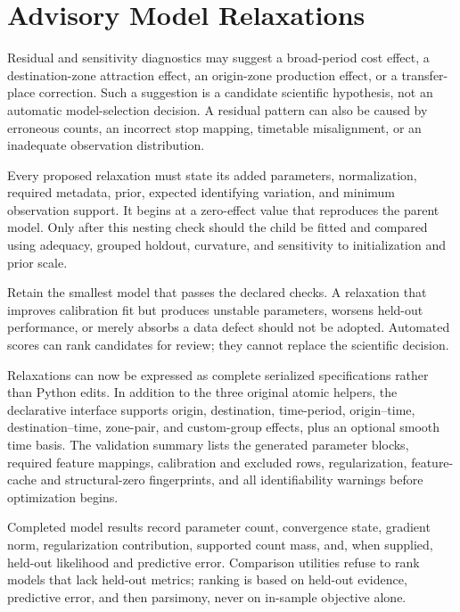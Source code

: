 
\section{Advisory Model Relaxations}
\label{sec:advisory-model-relaxations}

Residual and sensitivity diagnostics may suggest a broad-period cost effect, a
destination-zone attraction effect, an origin-zone production effect, or a
transfer-place correction. Such a suggestion is a candidate scientific
hypothesis, not an automatic model-selection decision. A residual pattern can
also be caused by erroneous counts, an incorrect stop mapping, timetable
misalignment, or an inadequate observation distribution.

Every proposed relaxation must state its added parameters, normalization,
required metadata, prior, expected identifying variation, and minimum
observation support. It begins at a zero-effect value that reproduces the parent
model. Only after this nesting check should the child be fitted and compared
using adequacy, grouped holdout, curvature, and sensitivity to initialization
and prior scale.

Retain the smallest model that passes the declared checks. A relaxation that
improves calibration fit but produces unstable parameters, worsens held-out
performance, or merely absorbs a data defect should not be adopted. Automated
scores can rank candidates for review; they cannot replace the scientific
decision.

Relaxations can now be expressed as complete serialized specifications rather
than Python edits. In addition to the three original atomic helpers, the
declarative interface supports origin, destination, time-period, origin--time,
destination--time, zone-pair, and custom-group effects, plus an optional smooth
time basis. The validation summary lists the generated parameter blocks,
required feature mappings, calibration and excluded rows, regularization,
feature-cache and structural-zero fingerprints, and all identifiability
warnings before optimization begins.

Completed model results record parameter count, convergence state, gradient
norm, regularization contribution, supported count mass, and, when supplied,
held-out likelihood and predictive error. Comparison utilities refuse to rank
models that lack held-out metrics; ranking is based on held-out evidence,
predictive error, and then parsimony, never on in-sample objective alone.
